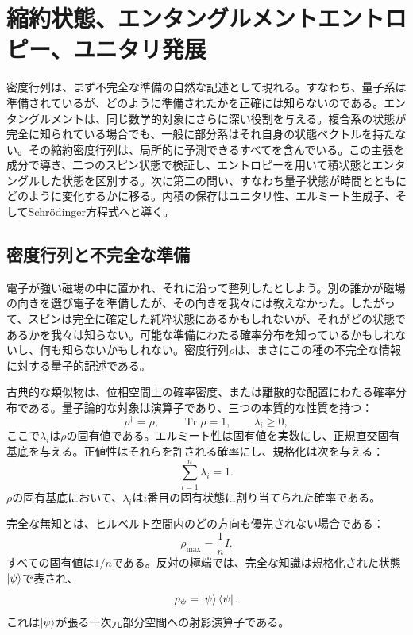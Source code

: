 \chapter{縮約状態、エンタングルメントエントロピー、ユニタリ発展}

密度行列は、まず不完全な準備の自然な記述として現れる。すなわち、量子系は準備されているが、どのように準備されたかを正確には知らないのである。エンタングルメントは、同じ数学的対象にさらに深い役割を与える。複合系の状態が完全に知られている場合でも、一般に部分系はそれ自身の状態ベクトルを持たない。その縮約密度行列は、局所的に予測できるすべてを含んでいる。この主張を成分で導き、二つのスピン状態で検証し、エントロピーを用いて積状態とエンタングルした状態を区別する。次に第二の問い、すなわち量子状態が時間とともにどのように変化するかに移る。内積の保存はユニタリ性、エルミート生成子、そしてSchr\"odinger方程式へと導く。

\section{密度行列と不完全な準備}

電子が強い磁場の中に置かれ、それに沿って整列したとしよう。別の誰かが磁場の向きを選び電子を準備したが、その向きを我々には教えなかった。したがって、スピンは完全に確定した純粋状態にあるかもしれないが、それがどの状態であるかを我々は知らない。可能な準備にわたる確率分布を知っているかもしれないし、何も知らないかもしれない。密度行列\(\rho\)は、まさにこの種の不完全な情報に対する量子的記述である。

古典的な類似物は、位相空間上の確率密度、または離散的な配置にわたる確率分布である。量子論的な対象は演算子であり、三つの本質的な性質を持つ：
\begin{equation}
\rho^\dagger=\rho,
\qquad
\operatorname{Tr}\rho=1,
\qquad
\lambda_i\geq 0,
\end{equation}
ここで\(\lambda_i\)は\(\rho\)の固有値である。エルミート性は固有値を実数にし、正規直交固有基底を与える。正値性はそれらを許される確率にし、規格化は次を与える：
\begin{equation}
\sum_{i=1}^{n}\lambda_i=1.
\end{equation}
\(\rho\)の固有基底において、\(\lambda_i\)は\(i\)番目の固有状態に割り当てられた確率である。

完全な無知とは、ヒルベルト空間内のどの方向も優先されない場合である：
\begin{equation}
\rho_{\mathrm{max}}=\frac{1}{n}I.
\end{equation}
すべての固有値は\(1/n\)である。反対の極端では、完全な知識は規格化された状態\(\left\lvert\psi\right\rangle\)で表され、
\begin{equation}
\rho_\psi=\left\lvert\psi\right\rangle\left\langle\psi\right\rvert.
\end{equation}
これは\(\left\lvert\psi\right\rangle\)が張る一次元部分空間への射影演算子である。

